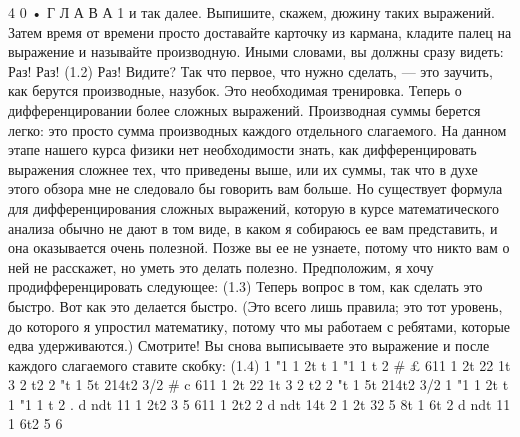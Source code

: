\documentclass[10pt,oneside]{article}
\begin{document}
4 0 • Г Л А В А  1 и так далее. Выпишите, скажем, дюжину таких выражений. Затем время от времени просто доставайте карточку из кармана, кладите палец на выражение и называйте производную. Иными словами, вы должны сразу видеть: Раз! Раз! (1.2) Раз! Видите? Так что первое, что нужно сделать, --- это заучить, как берутся производные, назубок. Это необходимая тренировка. Теперь о дифференцировании более сложных выражений. Производная суммы берется легко: это просто сумма производных каждого отдельного слагаемого. На данном этапе нашего курса физики нет необходимости знать, как дифференцировать выражения сложнее тех, что приведены выше, или их суммы, так что в духе этого обзора мне не следовало бы говорить вам больше. Но существует формула для дифференцирования сложных выражений, которую в курсе математического анализа обычно не дают в том виде, в каком я собираюсь ее вам представить, и она оказывается очень полезной. Позже вы ее не узнаете, потому что никто вам о ней не расскажет, но уметь это делать полезно. Предположим, я хочу продифференцировать следующее: (1.3) Теперь вопрос в том, как сделать это быстро. Вот как это делается быстро. (Это всего лишь правила; это тот уровень, до которого я упростил математику, потому что мы работаем с ребятами, которые едва удерживаются.) Смотрите! Вы снова выписываете это выражение и после каждого слагаемого ставите скобку: (1.4) 1 "1 1 2t t 1 "1 1 t 2 \# £ 611 1 2t 22 1t 3 2 t2 2 "t 1 5t 214t2 3/2 \# c 611 1 2t 22 1t 3 2 t2 2 "t 1 5t 214t2 3/2 1 "1 1 2t t 1 "1 1 t 2 . d ndt 11 1 2t2 3 5 611 1 2t2 2 d ndt 14t 2 1 2t 32 5 8t 1 6t 2 d ndt 11 1 6t2 5 6\par
\end{document}
